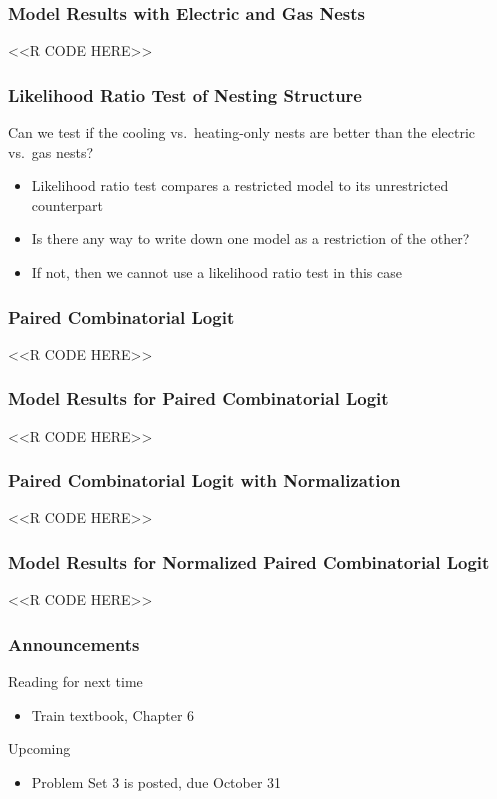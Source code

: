 \documentclass{beamer}
\begin{document}
\begin{frame}[fragile]\frametitle{Model Results with Electric and Gas Nests}
    \vspace{1ex}
    <<R CODE HERE>>
\end{frame}

\begin{frame}\frametitle{Likelihood Ratio Test of Nesting Structure}
    Can we test if the cooling vs.\ heating-only nests are better than the electric vs.\ gas nests?
    \begin{itemize}
        \item Likelihood ratio test compares a restricted model to its unrestricted counterpart
        \item Is there any way to write down one model as a restriction of the other?
        \item If not, then we cannot use a likelihood ratio test in this case
    \end{itemize}
\end{frame}

\begin{frame}[fragile]\frametitle{Paired Combinatorial Logit}
    <<R CODE HERE>>
\end{frame}

\begin{frame}[fragile]\frametitle{Model Results for Paired Combinatorial Logit}
    \vspace{1ex}
    <<R CODE HERE>>
\end{frame}

\begin{frame}[fragile]\frametitle{Paired Combinatorial Logit with Normalization}
    <<R CODE HERE>>
\end{frame}

\begin{frame}[fragile]\frametitle{Model Results for Normalized Paired Combinatorial Logit}
    \vspace{1ex}
    <<R CODE HERE>>
\end{frame}

\begin{frame}\frametitle{Announcements}
    Reading for next time
    \begin{itemize}
        \item Train textbook, Chapter 6
    \end{itemize}
    \vspace{3ex}
    Upcoming
    \begin{itemize}
        \item Problem Set 3 is posted, due October 31
    \end{itemize}
\end{frame}
\end{document}

